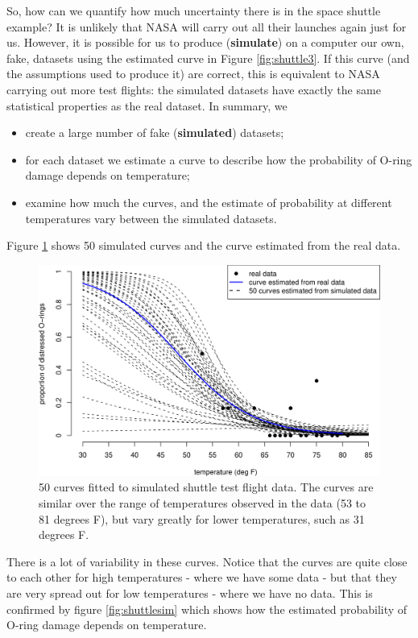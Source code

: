 \documentclass[
  11pt,
  british,
  openany, a4paper]{book}
\providecommand{\tightlist}{%
  \setlength{\itemsep}{0pt}\setlength{\parskip}{0pt}}
\begin{document}
So, how can we quantify how much uncertainty there is in the space shuttle example? It is unlikely that NASA will carry out all their launches again just for us. However, it is possible for us to produce (\textbf{simulate}) on a computer our own, fake, datasets using the estimated curve in Figure \ref{fig:shuttle3}. If this curve (and the assumptions used to produce it) are correct, this is equivalent to NASA carrying out more test flights: the simulated datasets have exactly the same statistical properties as the real dataset. In summary, we

\begin{itemize}
\tightlist
\item
  create a large number of fake (\textbf{simulated}) datasets;
\item
  for each dataset we estimate a curve to describe how the probability of O-ring damage depends on temperature;
\item
  examine how much the curves, and the estimate of probability at different temperatures vary between the simulated datasets.
\end{itemize}

Figure \ref{fig:shuttlesimcurves} shows 50 simulated curves and the curve estimated from the real data.

\begin{figure}

{\centering \includegraphics[width=0.75\linewidth]{images/shuttle_simcurves} 

}

\caption{50 curves fitted to simulated shuttle test flight data. The curves are similar over the range of temperatures observed in the data (53 to 81 degrees F), but vary greatly for lower temperatures, such as 31 degrees F.}\label{fig:shuttlesimcurves}
\end{figure}

There is a lot of variability in these curves. Notice that the curves are quite close to each other for high temperatures - where we have some data - but that they are very spread out for low temperatures - where we have no data. This is confirmed by figure \ref{fig:shuttlesim} which shows how the estimated probability of O-ring damage depends on temperature.
\end{document}
